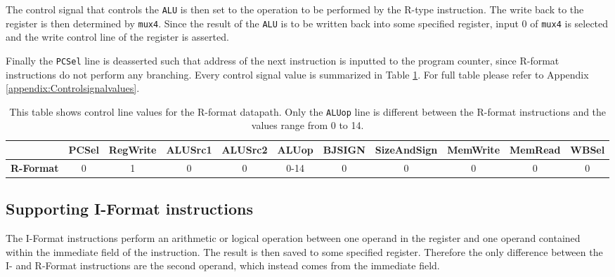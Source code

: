         The control signal that controls the \texttt{ALU} is then set to the operation to be performed by the R-type instruction. The write back to the register is then determined by \texttt{mux4}. Since the result of the \texttt{ALU} is to be written back into some specified register, input 0 of \texttt{mux4} is selected and the write control line of the register is asserted.
        
        Finally the \texttt{PCSel} line is deasserted such that address of the next instruction is inputted to the program counter, since R-format instructions do not perform any branching. Every control signal value is summarized in Table \ref{table:RFORMAT}. For full table please refer to Appendix \ref{appendix:Controlsignalvalues}.
        
        \begin{table}[h!]
            \small
            \hspace{-2.4cm}
            \begin{tabular}{|c||c|c|c|c|c|c|c|c|c|c|}
            	\hline
            	                  & \textbf{PCSel} & \textbf{RegWrite} & \textbf{ALUSrc1} & \textbf{ALUSrc2} & \textbf{ALUop} & \textbf{BJSIGN} & \textbf{SizeAndSign} & \textbf{MemWrite} & \textbf{MemRead} & \textbf{WBSel} \\ \hline\hline
            	\textbf{R-Format} &       0        &         1         &        0         &        0         &      0-14      &        0        &          0           &         0         &        0         &       0        \\ \hline
            \end{tabular}
            \caption{This table shows control line values for the R-format datapath. Only the \texttt{ALUop} line is different between the R-format instructions and the values range from 0 to 14.}
            \label{table:RFORMAT}
        \end{table}
    
    \subsection{Supporting I-Format instructions}
        The I-Format instructions perform an arithmetic or logical operation between one operand in the register and one operand contained within the immediate field of the instruction. The result is then saved to some specified register. Therefore the only difference between the I- and R-Format instructions are the second operand, which instead comes from the immediate field. 
        
